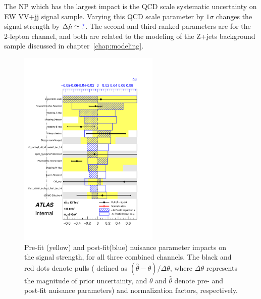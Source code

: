 The NP which has the largest impact is the QCD scale systematic uncertainty on EW VV+jj signal sample. 
Varying this QCD scale parameter by $1\sigma$ changes the signal strength by $\Delta \hat{\mu} \simeq \textcolor{blue}{?}$.
The second and third-ranked parameters are for the 2-lepton channel, and both are related to the modeling of the Z+jets background sample discussed in chapter~\ref{chap:modeling}.
\begin{figure}[ht]
      \centering
        \includegraphics[width=0.60\textwidth]{figures/2lep/FitResults/pulls_mu_SemileptonicVBS_5.pdf}
        \caption{Pre-fit (yellow) and post-fit(blue) nuisance parameter impacts on the signal strength, for all three combined channels. The black and red dots denote pulls ( defined as $(\hat{\theta}-\theta) / \Delta \theta$, where $\Delta \theta$ represents the magnitude of prior uncertainty, and $\theta$ and $\hat{\theta}$ denote pre- and post-fit nuisance parameters) and normalization factors, respectively. %
        }
       \label{fig:fit_2lep_ranking_all}
\end{figure}

